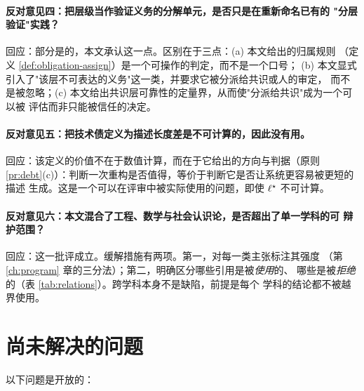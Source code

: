 \paragraph{反对意见四：把层级当作验证义务的分解单元，是否只是在重新命名已有的
"分层验证"实践？}
回应：部分是的，本文承认这一点。区别在于三点：(a) 本文给出的归属规则
（定义 \ref{def:obligation-assign}）是一个可操作的判定，而不是一个口号；
(b) 本文显式引入了"该层不可表达的义务"这一类，并要求它被分派给共识或人的审定，
而不是被忽略；(c) 本文给出共识层可靠性的定量界，从而使"分派给共识"成为一个可以被
评估而非只能被信任的决定。

\paragraph{反对意见五：把技术债定义为描述长度差是不可计算的，因此没有用。}
回应：该定义的价值不在于数值计算，而在于它给出的方向与判据（原则
\ref{pr:debt}(c)）：判断一次重构是否值得，等价于判断它是否让系统更容易被更短的描述
生成。这是一个可以在评审中被实际使用的问题，即使 $\ell^{\star}$ 不可计算。

\paragraph{反对意见六：本文混合了工程、数学与社会认识论，是否超出了单一学科的可
辩护范围？}
回应：这一批评成立。缓解措施有两项。第一，对每一类主张标注其强度
（第 \ref{ch:program} 章的三分法）；第二，明确区分哪些引用是被\emph{使用}的、
哪些是被\emph{拒绝}的（表 \ref{tab:relations}）。跨学科本身不是缺陷，前提是每个
学科的结论都不被越界使用。

\section{尚未解决的问题}

以下问题是开放的：

